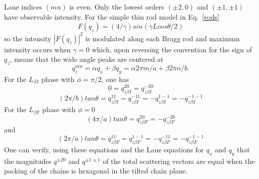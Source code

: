 Laue indices $(mn)$ is even. Only the lowest orders $(\pm2,0)$ and $(\pm1,\pm1)$ 
have observable intensity.  For the simple thin rod model in Eq.~\ref{rods} 
\begin{equation}\label{int}
F(q_z) = (4/\gamma)sin({\gamma}Lcos{\theta}/2)
\end{equation}
so the intensity $|F(q_z)|^2$ is modulated along each Bragg rod and maximum 
intensity occurs when $\gamma=0$ which, upon reversing the convention for the 
sign of $q_z$, means that the wide angle peaks are centered at
\begin{equation}\label{centers}
q_z^{mn}={\alpha}q_x+{\beta}q_y=\alpha2\pi{m}/a+\beta2\pi{n}/b.
\end{equation}
For the $L_{{\beta}I}$ phase with ${\phi}={\pi}/2$, one has
\begin{equation}\label{20LbI}
0=q_{z{\beta}I}^{20}=q_{z{\beta}I}^{-20}
\end{equation}
\begin{equation}\label{11LbI}
(2\pi/b)tan{\theta}=q_{z{\beta}I}^{11}=q_{z{\beta}I}^{-11}=-q_{z{\beta}I}^{1-1}=-q_{z{\beta}I}^{-1-1}
\end{equation}
For the $L_{{\beta}F}$ phase with ${\phi}=0$
\begin{equation}\label{20LbF}
(4\pi/a)tan{\theta}=q_{z{\beta}F}^{20}=-q_{z{\beta}F}^{-20}
\end{equation}
and
\begin{equation}\label{11LbF}
(2\pi/a)tan{\theta}=q_{z{\beta}F}^{11}=q_{z{\beta}F}^{1-1}=-q_{z{\beta}F}^{-11}=-q_{z{\beta}F}^{-1-1}
\end{equation}
One can verify, using these equations and the Laue equations for $q_x$ and $q_y$ 
that the magnitudes $q^{{\pm}20}$ and $q^{{\pm}1{\pm}1}$ of the total scattering 
vectors are equal when the packing of the chains is hexagonal in the tilted chain 
plane.  

